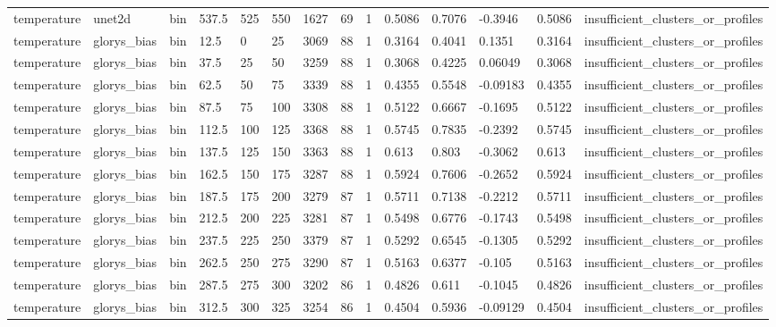 \begin{table}[htbp]
\begin{tabular}{llllllllllllll}
temperature & unet2d & bin & 537.5 & 525 & 550 & 1627 & 69 & 1 & 0.5086 & 0.7076 & -0.3946 & 0.5086 & insufficient\_clusters\_or\_profiles \\
temperature & glorys\_bias & bin & 12.5 & 0 & 25 & 3069 & 88 & 1 & 0.3164 & 0.4041 & 0.1351 & 0.3164 & insufficient\_clusters\_or\_profiles \\
temperature & glorys\_bias & bin & 37.5 & 25 & 50 & 3259 & 88 & 1 & 0.3068 & 0.4225 & 0.06049 & 0.3068 & insufficient\_clusters\_or\_profiles \\
temperature & glorys\_bias & bin & 62.5 & 50 & 75 & 3339 & 88 & 1 & 0.4355 & 0.5548 & -0.09183 & 0.4355 & insufficient\_clusters\_or\_profiles \\
temperature & glorys\_bias & bin & 87.5 & 75 & 100 & 3308 & 88 & 1 & 0.5122 & 0.6667 & -0.1695 & 0.5122 & insufficient\_clusters\_or\_profiles \\
temperature & glorys\_bias & bin & 112.5 & 100 & 125 & 3368 & 88 & 1 & 0.5745 & 0.7835 & -0.2392 & 0.5745 & insufficient\_clusters\_or\_profiles \\
temperature & glorys\_bias & bin & 137.5 & 125 & 150 & 3363 & 88 & 1 & 0.613 & 0.803 & -0.3062 & 0.613 & insufficient\_clusters\_or\_profiles \\
temperature & glorys\_bias & bin & 162.5 & 150 & 175 & 3287 & 88 & 1 & 0.5924 & 0.7606 & -0.2652 & 0.5924 & insufficient\_clusters\_or\_profiles \\
temperature & glorys\_bias & bin & 187.5 & 175 & 200 & 3279 & 87 & 1 & 0.5711 & 0.7138 & -0.2212 & 0.5711 & insufficient\_clusters\_or\_profiles \\
temperature & glorys\_bias & bin & 212.5 & 200 & 225 & 3281 & 87 & 1 & 0.5498 & 0.6776 & -0.1743 & 0.5498 & insufficient\_clusters\_or\_profiles \\
temperature & glorys\_bias & bin & 237.5 & 225 & 250 & 3379 & 87 & 1 & 0.5292 & 0.6545 & -0.1305 & 0.5292 & insufficient\_clusters\_or\_profiles \\
temperature & glorys\_bias & bin & 262.5 & 250 & 275 & 3290 & 87 & 1 & 0.5163 & 0.6377 & -0.105 & 0.5163 & insufficient\_clusters\_or\_profiles \\
temperature & glorys\_bias & bin & 287.5 & 275 & 300 & 3202 & 86 & 1 & 0.4826 & 0.611 & -0.1045 & 0.4826 & insufficient\_clusters\_or\_profiles \\
temperature & glorys\_bias & bin & 312.5 & 300 & 325 & 3254 & 86 & 1 & 0.4504 & 0.5936 & -0.09129 & 0.4504 & insufficient\_clusters\_or\_profiles \\

\end{tabular}
\end{table}
